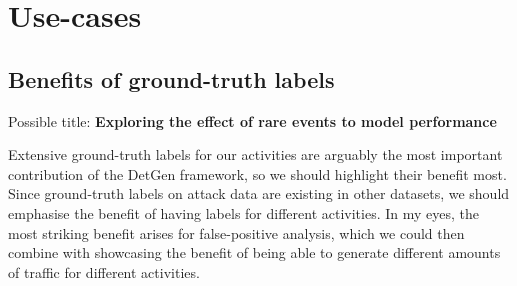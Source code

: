 \documentclass{article}
\begin{document}
%
%
%



\section{Use-cases}


\subsection{Benefits of ground-truth labels}
Possible title: \textbf{Exploring the effect of rare events to model performance}

Extensive ground-truth labels for our activities are arguably the most important contribution of the DetGen framework, so we should highlight their benefit most. Since ground-truth labels on attack data are existing in other datasets, we should emphasise the benefit of having labels for different activities. In my eyes, the most striking benefit arises for false-positive analysis, which we could then combine with showcasing the benefit of being able to generate different amounts of traffic for different activities.
\end{document}
